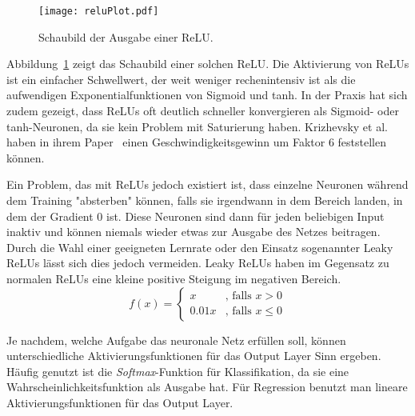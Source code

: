 \begin{figure}[h]
	\centering
	\texttt{[image: reluPlot.pdf]}
	\caption{Schaubild der Ausgabe einer ReLU.}
	\label{reluoutput}
\end{figure}
Abbildung~\ref{reluoutput} zeigt das Schaubild einer solchen ReLU. 
Die Aktivierung von ReLUs ist ein einfacher Schwellwert, der weit weniger rechenintensiv ist als die aufwendigen Exponentialfunktionen von Sigmoid und tanh.
In der Praxis hat sich zudem gezeigt, dass ReLUs oft deutlich schneller konvergieren als Sigmoid- oder tanh-Neuronen, da sie kein Problem mit Saturierung haben.
Krizhevsky et al. haben in ihrem Paper~\cite{NIPS2012_4824} einen Geschwindigkeitsgewinn um Faktor 6 feststellen können.

Ein Problem, das mit ReLUs jedoch existiert ist, dass einzelne Neuronen während dem Training "absterben" können, falls sie irgendwann in dem Bereich landen, in dem der Gradient 0 ist.
Diese Neuronen sind dann für jeden beliebigen Input inaktiv und können niemals wieder etwas zur Ausgabe des Netzes beitragen.
Durch die Wahl einer geeigneten Lernrate oder den Einsatz sogenannter Leaky ReLUs lässt sich dies jedoch vermeiden.
Leaky ReLUs haben im Gegensatz zu normalen ReLUs eine kleine positive Steigung im negativen Bereich.
\begin{equation}
	f(x) = \begin{cases}
		x &\text{, falls } x  >  0\\
		0.01 x &\text{, falls } x  \leq  0
	\end{cases}
\end{equation} 

Je nachdem, welche Aufgabe das neuronale Netz erfüllen soll, können unterschiedliche Aktivierungsfunktionen für das Output Layer Sinn ergeben.
Häufig genutzt ist die \textit{Softmax}-Funktion für Klassifikation, da sie eine Wahrscheinlichkeitsfunktion als Ausgabe hat.
Für Regression benutzt man lineare Aktivierungsfunktionen für das Output Layer. 










